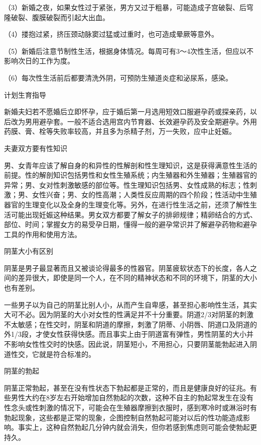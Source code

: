 \documentclass[12pt,UTF8]{ctexbook}
\begin{document}
（3）新婚之夜，如果女性过于紧张，男方又过于粗暴，可能造成子宫破裂、后穹隆破裂、腹膜破裂而引起大出血。

（4）搂抱过紧，挤压颈动脉窦过猛或过重时，也可造成晕厥等意外。

（5）新婚后注意节制性生活，根据身体情况。每周可有3～4次性生活，但应以不影响次日的工作为度。

（6）每次性生活前后都要清洗外阴，可预防生殖道炎症和泌尿系，感染。





计划生育指导


新婚夫妇若不愿婚后立即怀孕，应于婚后第一月选用短效口服避孕药或探亲药，以后改为男用避孕套。一般不适合选用宫内节育器、长效避孕药及安全期避孕。外用药膜、膏、栓等失败率较高，并且多为杀精子剂，万一失败，应中止妊娠。





夫妻双方要有性知识


男、女青年应该了解自身的和异性的性解剖和性生理知识，这是获得满意性生活的前提。性的解剖知识包括男性和女性生殖系统；内生殖器和外生殖器；生殖器官的异常；男、女对性刺激敏感的部位等。性生理知识包括男、女性成熟的标志；性刺激；男、女性兴奋；男、女的性高潮；人类性反应周期的四个阶段；性活动中生殖器官的生理变化以及全身的生理变化等。另外，在进行性生活之前，还须了解性生活可能出现妊娠这种结果。男女双方都要了解女子的排卵规律；精卵结合的方式、部位、时间；掌握女方的易受孕日期，懂得一般的避孕常识并了解避孕药物和避孕工具的作用和使用方法。





阴茎大小有区别


阴茎是男子最显著而且又被谈论得最多的性器官。阴茎疲软状态下的长度，各人之间的差异很大，即使是同一个人，在不同的精神状态和不同的环境下，阴茎的大小也有差别。

一些男子以为自己的阴茎比别人小，从而产生自卑感，甚至担心影响性生活，其实大可不必。因为阴茎的大小对女性的性满足并不十分重要。阴道2/3对阴茎的刺激不太敏感；在性交时，阴茎和阴道的摩擦，刺激了阴蒂、小阴唇、阴道口及阴道的外1/3段，才使女性获得快感。而且事实上由于阴道富有弹性，男性阴茎的大小并不影响女性性交时的快感。因此说，阴茎短小，不用担心，只要阴茎能勃起进入阴道性交，它就是符合标准的。





阴茎的勃起


阴茎正常勃起，甚至在没有性状态下勃起都是正常的，而且是健康良好的征兆。有些男性大约在8岁左右开始增加自然勃起的次数，这种不自主的勃起常发生在没有性念头或性刺激的情况下，可能会在生殖器摩擦到衣服时，感到寒冷时或淋浴时有勃起现象，这些都是正常的现象，企图控制自然勃起可能对以后的性功能造成影响。事实上，这种自然勃起几分钟内就会消失，但你若感到焦虑则可能会使勃起更持久。
\end{document}
